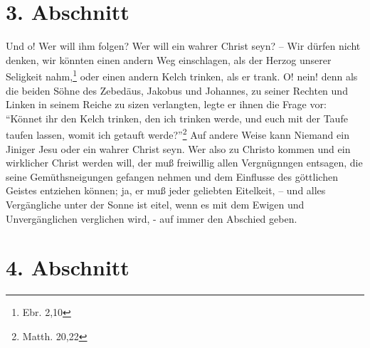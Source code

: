 \section{3. Abschnitt}

Und o! Wer will ihm folgen? Wer will ein wahrer Christ seyn? -- Wir dürfen nicht
denken, wir könnten einen andern Weg einschlagen, als der Herzog unserer
Seligkeit nahm,\footnote{Ebr. 2,10} oder einen andern Kelch trinken, als er
trank. O! nein! denn als die beiden Söhne des Zebedäus, Jakobus und Johannes, zu
seiner Rechten und Linken in seinem Reiche zu sizen verlangten, legte er ihnen
die Frage vor: "`Könnet ihr den Kelch trinken, den ich trinken werde, und euch
mit der Taufe taufen lassen, womit ich getauft werde?"'\footnote{Matth. 20,22}
Auf andere Weise kann Niemand ein Jiniger Jesu oder ein wahrer Christ seyn. Wer
also zu Christo kommen und ein wirklicher Christ werden will, der muß freiwillig
allen Vergnügnngen entsagen, die seine Gemüthsneigungen gefangen nehmen und dem
Einflusse des göttlichen Geistes entziehen können; ja, er muß jeder geliebten
Eitelkeit, – und alles Vergängliche unter der Sonne ist eitel, wenn es mit dem
Ewigen und Unvergänglichen verglichen wird, - auf immer den Abschied geben.

\section{4. Abschnitt}

